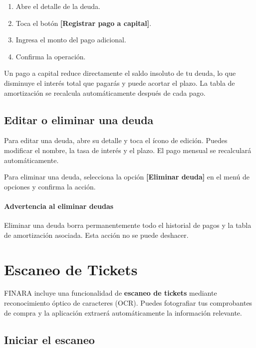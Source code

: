 \documentclass[a4paper,12pt]{report}
\newcommand{\boton}[1]{\textbf{\textcolor{azulipn}{[#1]}}}
\begin{document}
\begin{enumerate}
  \item Abre el detalle de la deuda.
  \item Toca el botón \boton{Registrar pago a capital}.
  \item Ingresa el monto del pago adicional.
  \item Confirma la operación.
\end{enumerate}

Un pago a capital reduce directamente el saldo insoluto de tu deuda,
lo que disminuye el interés total que pagarás y puede acortar el plazo.
La tabla de amortización se recalcula automáticamente después de cada
pago.

\section{Editar o eliminar una deuda}

Para editar una deuda, abre su detalle y toca el ícono de edición. Puedes
modificar el nombre, la tasa de interés y el plazo. El pago mensual se
recalculará automáticamente.

Para eliminar una deuda, selecciona la opción \boton{Eliminar deuda} en
el menú de opciones y confirma la acción.

\subsubsection*{Advertencia al eliminar deudas}

Eliminar una deuda borra permanentemente todo el historial de pagos y
la tabla de amortización asociada. Esta acción no se puede deshacer.


\chapter{Escaneo de Tickets}

FINARA incluye una funcionalidad de \textbf{escaneo de tickets} mediante
reconocimiento óptico de caracteres (OCR). Puedes fotografiar tus
comprobantes de compra y la aplicación extraerá automáticamente la
información relevante.

\section{Iniciar el escaneo}
\end{document}
